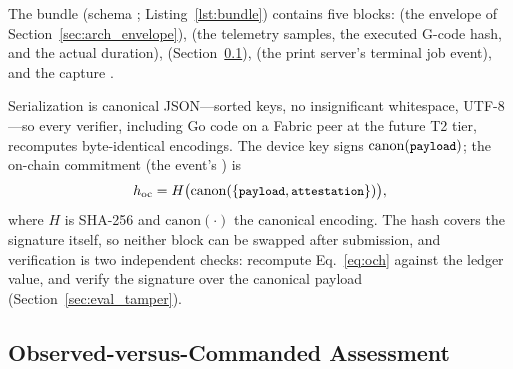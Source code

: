 The bundle (schema ;
Listing~\ref{lst:bundle}) contains five blocks:  (the
envelope of Section~\ref{sec:arch_envelope}),  (the
telemetry samples, the executed G-code hash, and the actual duration),
 (Section~\ref{sec:arch_assessment}), 
(the print server's terminal job event), and the capture .

Serialization is canonical JSON---sorted keys, no insignificant
whitespace, UTF-8---so every verifier, including Go code on a Fabric peer
at the future T2 tier, recomputes byte-identical encodings.  The device
key signs $\mathrm{canon}({\small\texttt{payload}})$; the on-chain commitment (the
event's ) is
\begin{equation}
h_{\mathrm{oc}} = H\bigl(\mathrm{canon}(\{{\small\texttt{payload}},
{\small\texttt{attestation}}\})\bigr),
\label{eq:och}
\end{equation}
where $H$ is SHA-256 and $\mathrm{canon}(\cdot)$ the canonical encoding.
The hash covers the signature itself, so neither block can be swapped
after submission, and verification is two independent checks: recompute
Eq.~\eqref{eq:och} against the ledger value, and verify the signature
over the canonical payload (Section~\ref{sec:eval_tamper}).

\subsection{Observed-versus-Commanded Assessment}
\label{sec:arch_assessment}

